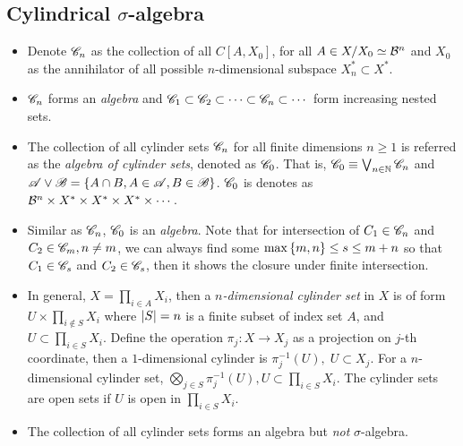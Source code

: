 \documentclass[11pt]{article}
\begin{document}
\subsection{Cylindrical $\sigma$-algebra}
\begin{itemize}\vspace{-10pt}
\item Denote ${\mathscr C}_{n}$ as the collection of all $C[A, X_{0}]$, for all $A\in X/X_{0}\simeq {\mathcal B}^{n}$ and $X_{0}$ as the annihilator of all possible $n$-dimensional subspace $X_{n}^{*} \subset X^{*}$. 

\item ${\mathscr C}_{n}$ forms an \emph{algebra} and ${\mathscr C}_{1} \subset {\mathscr C}_{2}\subset \cdots \subset {\mathscr C}_{n} \subset \cdots$ form increasing nested sets.

\item \begin{definition}
The collection of all cylinder sets ${\mathscr C}_{n}$  for all finite dimensions $n\ge 1$ is referred as the \emph{algebra of cylinder sets}, denoted as ${\mathscr C}_{0}$. That is, ${\mathscr C}_{0}\equiv \bigvee_{n\in {\mathbb N}}{\mathscr C}_{n}$ and ${\mathscr A}\vee {\mathscr B} = \left\{A\cap B, A\in {\mathscr A}, B\in {\mathscr B}\right\}$. ${\mathscr C}_{0}$ is denotes as ${\mathcal B}^{n}\times X^{*}\times X^{*} \times X^{*} \times \cdots$.
\end{definition} 

\item Similar as ${\mathscr C}_{n}$, ${\mathscr C}_{0}$ is an \emph{algebra}. Note that for intersection of $C_{1}\in {\mathscr C}_{n}$ and $C_{2} \in{\mathscr C}_{m}, n\neq m$, we can always find some $\max\left\{m,n\right\} \le s\le m+n$ so that $C_{1}\in {\mathscr C}_{s}$  and $C_{2}\in {\mathscr C}_{s}$, then it shows the closure under finite intersection. 


\item In general, $X= \prod_{i\in A}X_{i}$, then a \emph{$n$-dimensional cylinder set} in $X$ is of form $U\times \prod_{i\not\in S}X_{i}$ where $\left\lvert S \right\rvert= n$ is a finite subset of index set $A$, and $U\subset \prod_{i \in S}X_{i}$. Define the operation $\pi_{j}: X \rightarrow X_{j}$ as a projection on $j$-th coordinate, then a $1$-dimensional cylinder is $\pi_{j}^{-1}(U), \; U\subset X_{j}$. For a $n$-dimensional cylinder set, $\bigotimes_{j\in S}\pi_{j}^{-1}(U), U\subset \prod_{i \in S}X_{i}$. The cylinder sets are open sets if $U$ is open in $\prod_{i \in S}X_{i}$.

\item The collection of all cylinder sets forms an algebra but \emph{not} $\sigma$-algebra. \\


\end{itemize}
\end{document}
